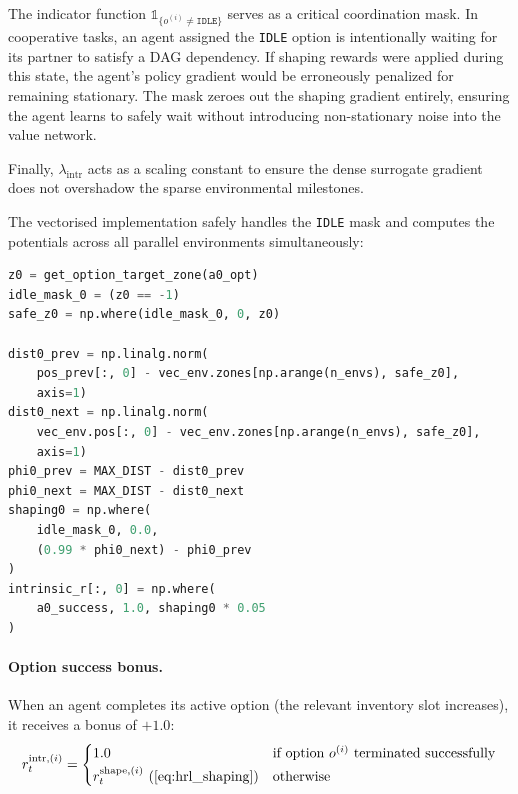 The indicator function $\mathds{1}_{\{o^{(i)} \neq \texttt{IDLE}\}}$ serves as a critical coordination mask. In cooperative tasks, an agent assigned the \texttt{IDLE} option is intentionally waiting for its partner to satisfy a DAG dependency. If shaping rewards were applied during this state, the agent's policy gradient would be erroneously penalized for remaining stationary. The mask zeroes out the shaping gradient entirely, ensuring the agent learns to safely wait without introducing non-stationary noise into the value network.

Finally, $\lambda_{\text{intr}}$ acts as a scaling constant to ensure the dense surrogate gradient does not overshadow the sparse environmental milestones. 

The vectorised implementation safely handles the \texttt{IDLE} mask and computes the potentials across all parallel environments simultaneously:

\begin{lstlisting}[style=code, language=Python, caption={Per-agent intrinsic shaping in \texttt{hrl\_train\_loop.py}.}, label={lst:hrl_intrinsic}]
z0 = get_option_target_zone(a0_opt)
idle_mask_0 = (z0 == -1)
safe_z0 = np.where(idle_mask_0, 0, z0)

dist0_prev = np.linalg.norm(
    pos_prev[:, 0] - vec_env.zones[np.arange(n_envs), safe_z0],
    axis=1)
dist0_next = np.linalg.norm(
    vec_env.pos[:, 0] - vec_env.zones[np.arange(n_envs), safe_z0],
    axis=1)
phi0_prev = MAX_DIST - dist0_prev
phi0_next = MAX_DIST - dist0_next
shaping0 = np.where(
    idle_mask_0, 0.0,
    (0.99 * phi0_next) - phi0_prev
)
intrinsic_r[:, 0] = np.where(
    a0_success, 1.0, shaping0 * 0.05
)
\end{lstlisting}

\paragraph{Option success bonus.}
When an agent completes its active option (the relevant inventory slot
increases), it receives a bonus of $+1.0$:
\begin{equation}
\label{eq:success_bonus}
    r_t^{\text{intr},(i)}
    =
    \begin{cases}
        1.0 & \text{if option } o^{(i)} \text{ terminated successfully} \\[2pt]
        r_t^{\text{shape},(i)} \text{ (\cref{eq:hrl_shaping})} & \text{otherwise}
    \end{cases}
\end{equation}

